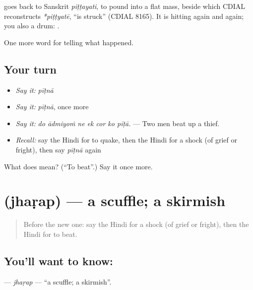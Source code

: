 \begin{cousinweb}
goes back to Sanskrit \emph{piṭṭayati}, to pound into a flat mass, beside which CDIAL reconstructs \emph{*piṭṭyatē}, \textquotedblleft{}is struck\textquotedblright{} (CDIAL 8165). It is hitting again and again; you also \textbf{} a drum: \textbf{ }.
\end{cousinweb}

\begin{grammarlens}[title={What you've built}]
One more word for telling what happened.
\end{grammarlens}

\subsection*{Your turn}
\begin{itemize}
\raggedright
  \item \emph{Say it:} \emph{pīṭnā}
  \item \emph{Say it:} \emph{pīṭnā}, once more
  \item \emph{Say it:} \emph{do ādmiyoṁ ne ek cor ko pīṭā.} — Two men beat up a thief.
  \item \emph{Recall:} say the Hindi for to quake, then the Hindi for a shock (of grief or fright), then say \emph{pīṭnā} again
\end{itemize}

\begin{tcolorbox}[breakable,colback=teal!4,colframe=teal!35!black,title={Before you move on}]
What does  mean? (\textquotedblleft{}To beat\textquotedblright{}.) Say it once more.
\end{tcolorbox}
\section[\texorpdfstring{\hi{झड़प} (jhaṛap)}{झड़प (jhaṛap)}]{ (jhaṛap) — a scuffle; a skirmish}

\label{lesson:HI-C319-jharap}



\begin{quote}
Before the new one: say the Hindi for a shock (of grief or fright), then the Hindi for to beat.
\end{quote}

\subsection*{You'll want to know: }
\textbf{} — \emph{jhaṛap} — \textquotedblleft{}a scuffle; a skirmish\textquotedblright{}.

